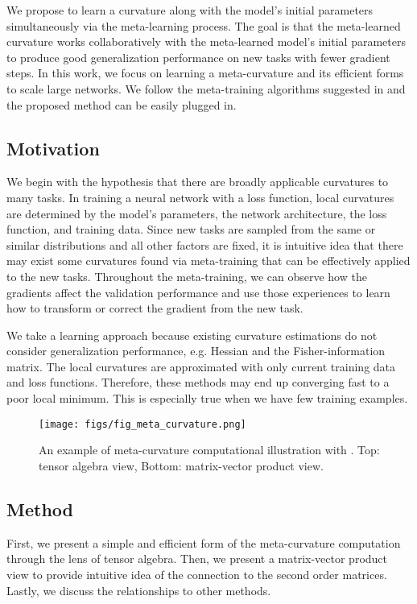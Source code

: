 \documentclass{article}
\begin{document}
We propose to learn a curvature along with the model's initial parameters simultaneously via the meta-learning process. The goal is that the meta-learned curvature works collaboratively with the meta-learned model's initial parameters to produce good generalization performance on new tasks with fewer gradient steps. In this work, we focus on learning a meta-curvature and its efficient forms to scale large networks. We follow the meta-training algorithms suggested in \cite{Finn-icml-2017} and the proposed method can be easily plugged in. 

\subsection{Motivation}
We begin with the hypothesis that there are broadly applicable curvatures to many tasks. In training a neural network with a loss function, local curvatures are determined by the model’s parameters, the network architecture, the loss function, and training data. Since new tasks are sampled from the same or similar distributions and all other factors are fixed, it is intuitive idea that there may exist some curvatures found via meta-training that can be effectively applied to the new tasks. Throughout the meta-training, we can observe how the gradients affect the validation performance and use those experiences to learn how to transform or correct the gradient from the new task.

We take a learning approach because existing curvature estimations do not consider generalization performance, e.g. Hessian and the Fisher-information matrix. The local curvatures are approximated with only current training data and loss functions. Therefore, these methods may end up converging fast to a poor local minimum. This is especially true when we have few training examples.



\begin{figure*}[t]
\begin{center}
\centerline{\texttt{[image: figs/fig\_meta\_curvature.png]}}
\caption{An example of meta-curvature computational illustration with . Top: tensor algebra view, Bottom: matrix-vector product view.}
\label{fig_meta_curvature}
\end{center}
\vskip -0.3in
\end{figure*}


\subsection{Method}
First, we present a simple and efficient form of the meta-curvature computation through the lens of tensor algebra. Then, we present a matrix-vector product view to provide intuitive idea of the connection to the second order matrices. Lastly, we discuss the relationships to other methods.
\end{document}
